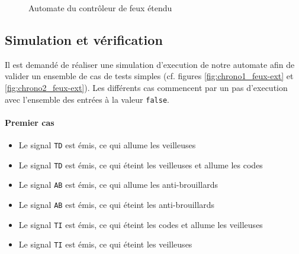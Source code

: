 \documentclass{article}
\begin{document}
      \begin{figure}
        \centering
        \caption{Automate du contrôleur de feux étendu}
        \label{fig:autom_feux-ext}
      \end{figure}

    \subsection{Simulation et vérification}

      Il est demandé de réaliser une simulation d'execution de notre automate
      afin de valider un ensemble de cas de tests simples (cf. figures
      \ref{fig:chrono1_feux-ext} et \ref{fig:chrono2_feux-ext}). Les différents
      cas commencent par un pas d'execution avec l'ensemble des entrées à la
      valeur {\tt false}.

      \paragraph{Premier cas}
        \begin{itemize}
          \item Le signal {\tt TD} est émis, ce qui allume les veilleuses
          \item Le signal {\tt TD} est émis, ce qui éteint les veilleuses et
            allume les codes
          \item Le signal {\tt AB} est émis, ce qui allume les anti-brouillards
          \item Le signal {\tt AB} est émis, ce qui éteint les anti-brouillards
          \item Le signal {\tt TI} est émis, ce qui éteint les codes et allume
            les veilleuses
          \item Le signal {\tt TI} est émis, ce qui éteint les veilleuses
        \end{itemize}
\end{document}

